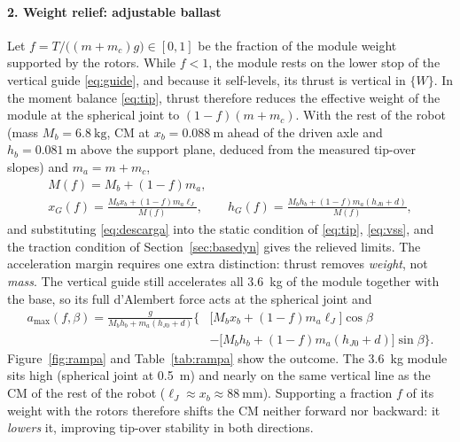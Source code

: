 \paragraph{2. Weight relief: adjustable ballast}
Let $f=T/\big((m+m_c)g\big)\in[0,1]$ be the fraction of the module weight supported by the rotors. While $f<1$, the module rests on the lower stop of the vertical guide \eqref{eq:guide}, and because it self-levels, its thrust is vertical in $\{W\}$. In the moment balance \eqref{eq:tip}, thrust therefore reduces the effective weight of the module at the spherical joint to $(1-f)(m+m_c)$. With the rest of the robot (mass $M_b=\SI{6.8}{\kilo\gram}$, CM at $x_b=\SI{0.088}{\metre}$ ahead of the driven axle and $h_b=\SI{0.081}{\metre}$ above the support plane, deduced from the measured tip-over slopes) and $m_a=m+m_c$,
\begin{equation}
\begin{gathered}
  M(f)=M_b+(1-f)m_a,\\
  x_G(f)=\frac{M_bx_b+(1-f)m_a\ell_J}{M(f)},\qquad
  h_G(f)=\frac{M_bh_b+(1-f)m_a(h_{J0}+d)}{M(f)},
\end{gathered}
  \label{eq:descarga}
\end{equation}
and substituting \eqref{eq:descarga} into the static condition of \eqref{eq:tip}, \eqref{eq:vss}, and the traction condition of Section~\ref{sec:basedyn} gives the relieved limits. The acceleration margin requires one extra distinction: thrust removes \emph{weight}, not \emph{mass}. The vertical guide still accelerates all \SI{3.6}{\kilo\gram} of the module together with the base, so its full d'Alembert force acts at the spherical joint and
\begin{equation}
\begin{split}
  a_{\max}(f,\beta)=\frac{g}{M_bh_b+m_a(h_{J0}+d)}\Big\{&\big[M_bx_b+(1-f)m_a\ell_J\big]\cos\beta\\
  &-\big[M_bh_b+(1-f)m_a(h_{J0}+d)\big]\sin\beta\Big\}.
\end{split}
  \label{eq:amaxf}
\end{equation} Figure~\ref{fig:rampa} and Table~\ref{tab:rampa} show the outcome. The \SI{3.6}{\kilo\gram} module sits high (spherical joint at \SI{0.5}{\metre}) and nearly on the same vertical line as the CM of the rest of the robot ($\ell_J\approx x_b\approx\SI{88}{\milli\metre}$). Supporting a fraction $f$ of its weight with the rotors therefore shifts the CM neither forward nor backward: it \emph{lowers} it, improving tip-over stability in both directions.
